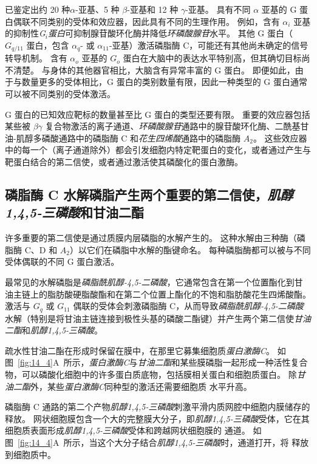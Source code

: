 已鉴定出约 20 种$\alpha$-亚基、5 种 $\beta$-亚基和 12 种 $\gamma$-亚基。
具有不同 $\alpha$ 亚基的 G 蛋白偶联不同类别的受体和效应器，因此具有不同的生理作用。
例如，含有 $\alpha _i$ 亚基的抑制性\textit{G$_i $蛋白}可抑制腺苷酸环化酶并降低\textit{环磷酸腺苷}水平。
其他 G 蛋白（$ G_{q/11} $ 蛋白，包含 $\alpha_q$- 或 $\alpha_{11}$-亚基）激活磷脂酶 C，可能还有其他尚未确定的信号转导机制。
含有 $\alpha_o$ 亚基的 $G_o$ 蛋白在大脑中的表达水平特别高，但其确切目标尚不清楚。
与身体的其他器官相比，大脑含有异常丰富的 G 蛋白。
即便如此，由于与数量更多的受体相比，G 蛋白的类别数量有限，因此一种类型的 G 蛋白通常可以被不同类别的受体激活。


G 蛋白的已知效应靶标的数量甚至比 G 蛋白的类型还要有限。
重要的效应器包括某些被 $\beta \gamma$ 复合物激活的离子通道、\textit{环磷酸腺苷}通路中的腺苷酸环化酶、二酰基甘油-肌醇多磷酸通路中的磷脂酶 C 和\textit{花生四烯酸}通路中的磷脂酶 $A_2$。
这些效应器中的每一个（离子通道除外）都会引发细胞内特定靶蛋白的变化，或者通过产生与靶蛋白结合的第二信使，或者通过激活使其磷酸化的蛋白激酶。



\subsection{磷脂酶 C 水解磷脂产生两个重要的第二信使，\textit{肌醇1,4,5-三磷酸}和甘油二酯}

许多重要的第二信使是通过质膜内层磷脂的水解产生的。 
这种水解由三种酶（磷脂酶 C、D 和 $A_2$）以它们在磷脂中水解的酯键命名。
每种磷脂酶都可以被与不同受体偶联的不同 G 蛋白激活。


最常见的水解磷脂是\textit{磷脂酰肌醇-4,5-二磷酸}，它通常包含在第一个位置酯化到甘油主链上的脂肪酸硬脂酸酯和在第二个位置上酯化的不饱和脂肪酸花生四烯酸酯。
激活与 $ G_q $ 或 $ G_{11} $ 偶联的受体会刺激磷脂酶 C，从而导致\textit{磷脂酰肌醇-4,5-二磷酸}水解（特别是将甘油主链连接到极性头基的磷酸二酯键）并产生两个第二信使\textit{甘油二酯}和\textit{肌醇1,4,5-三磷酸}。


疏水性甘油二酯在形成时保留在膜中，在那里它募集细胞质\textit{蛋白激酶C}。
如图~\ref{fig:14_4}A~所示，\textit{蛋白激酶C}与\textit{甘油二酯}和某些膜磷脂一起形成一种活性复合物，可以磷酸化细胞中的许多蛋白质底物，包括膜相关蛋白和细胞质蛋白。
除\textit{甘油二酯}外，某些\textit{蛋白激酶C}同种型的激活还需要细胞质  水平升高。


磷脂酶 C 通路的第二个产物\textit{肌醇1,4,5-三磷酸}刺激平滑内质网腔中细胞内膜储存的  释放。
网状细胞膜包含一个大的完整膜大分子，即\textit{肌醇1,4,5-三磷酸}受体，它在其细胞质表面形成\textit{肌醇1,4,5-三磷酸}受体和跨越网状细胞膜的  通道。
如图~\ref{fig:14_4}A~所示，当这个大分子结合\textit{肌醇1,4,5-三磷酸}时，通道打开，将  释放到细胞质中。


